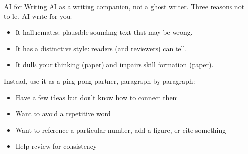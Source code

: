 \documentclass[aspectratio=169]{beamer}
\begin{document}
\begin{frame}{AI for Writing}
    AI as a writing companion, not a ghost writer. Three reasons not to let AI write for you:
    \begin{itemize}
        \vspace{0.3em}
        \item It hallucinates: plausible-sounding text that may be wrong.
        \vspace{0.3em}
        \item It has a distinctive style: readers (and reviewers) can tell.
        \vspace{0.3em}
        \item It dulls your thinking (\href{https://doi.org/10.3389/feduc.2026.1759062}{paper}) and impairs skill formation (\href{https://arxiv.org/abs/2601.20245}{paper}).
    \end{itemize}

    \vspace{0.8em}
    Instead, use it as a ping-pong partner, paragraph by paragraph:
    \begin{itemize}
        \vspace{0.3em}
        \item Have a few ideas but don't know how to connect them
        \vspace{0.3em}
        \item Want to avoid a repetitive word
        \vspace{0.3em}
        \item Want to reference a particular number, add a figure, or cite something
        \vspace{0.3em}
        \item Help review for consistency
    \end{itemize}
\end{frame}
\end{document}
